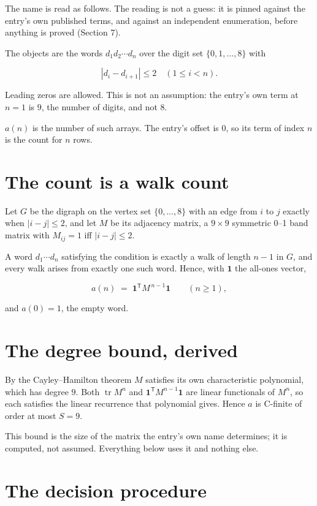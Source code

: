 \documentclass[11pt]{article}
\theoremstyle{definition}
\begin{document}
The name is read as follows. The reading is not a guess: it is pinned against the entry's own published terms, and against an independent enumeration, before anything is proved (Section 7).

The objects are the words $d_1 d_2 \cdots d_n$ over the digit set $\{0,1,\dots,8\}$ with

\[|d_i - d_{i+1}| \le 2\quad (1 \le i < n).\]

Leading zeros are allowed. This is not an assumption: the entry's own term at $n=1$ is $9$, the number of digits, and not $8$.

$a(n)$ is the number of such arrays. The entry's offset is 0, so its term of index $n$ is the count for $n$ rows.

\section{The count is a walk count}

Let $G$ be the digraph on the vertex set $\{0,\dots,8\}$ with an edge from $i$ to $j$ exactly when $|i-j| \le 2$, and let $M$ be its adjacency matrix, a $9 \times 9$ symmetric 0--1 band matrix with $M_{ij} = 1$ iff $|i-j| \le 2$.

A word $d_1\cdots d_n$ satisfying the condition is exactly a walk of length $n-1$ in $G$, and every walk arises from exactly one such word. Hence, with $\mathbf 1$ the all-ones vector,

\[a(n) \;=\; \mathbf 1^{\mathsf T} M^{\,n-1} \mathbf 1 \qquad (n \ge 1),\]

and $a(0) = 1$, the empty word.

\section{The degree bound, derived}

By the Cayley--Hamilton theorem $M$ satisfies its own characteristic polynomial, which has degree $9$. Both $\operatorname{tr} M^n$ and $\mathbf 1^{\mathsf T} M^{n-1} \mathbf 1$ are linear functionals of $M^{n}$, so each satisfies the linear recurrence that polynomial gives. Hence $a$ is C-finite of order at most $S = 9$.

This bound is the size of the matrix the entry's own name determines; it is computed, not assumed. Everything below uses it and nothing else.

\section{The decision procedure}
\end{document}
